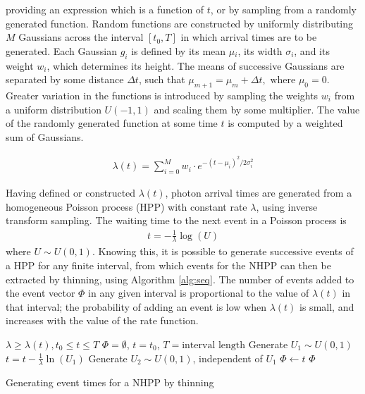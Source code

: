 \documentclass[a4paper,11pt]{article}
\begin{document}
  providing an expression which is a function of $t$, or by sampling from a
  randomly generated function. Random functions are constructed by uniformly
  distributing $M$ Gaussians across the interval $\left[t_0,T\right]$ in which
  arrival times are to be generated. Each Gaussian $g_i$ is defined by its mean
  $\mu$$_i$, its width $\sigma$$_i$, and its weight $w_i$, which determines its
  height. The means of successive Gaussians are separated by some distance
  $\Delta t$, such that $\mu_{m+1}=\mu_m + \Delta t,\text{ where }
  \mu_0=0$. Greater variation in the functions is introduced by sampling the
  weights $w_i$ from a uniform distribution $U(-1,1)$ and scaling them by some
  multiplier. The value of the randomly generated function at some time $t$ is
  computed by a weighted sum of Gaussians.

  \begin{align}
  \lambda(t) = \sum_{i=0}^M w_i\cdot e^{-(t-\mu_i)^2/2\sigma_i^2}
  \end{align}

  Having defined or constructed $\lambda(t)$, photon arrival times are generated
  from a homogeneous Poisson process (HPP) with constant rate $\lambda$, using
  inverse transform sampling. The waiting time to the next event in a Poisson
  process is \cite{1998art}
  \begin{align}\label{eq:homlambda}
  t=-\frac{1}{\lambda}\log(U)
  \end{align} where $U\sim U(0,1)$. Knowing this, it is possible to generate
  successive events of a HPP for any finite interval, from which events for the
  NHPP can then be extracted by thinning, using Algorithm \ref{alg:seq}. The
  number of events added to the event vector $\Phi$ in any given interval is
  proportional to the value of $\lambda(t)$ in that interval; the probability of
  adding an event is low when $\lambda(t)$ is small, and increases with the
  value of the rate function.

  \begin{algorithm}[H]
  \begin{algorithmic}[1]
  \REQUIRE $\lambda\geq \lambda(t), t_0 \leq t \leq T$
  \STATE $\Phi=\emptyset$, $t=t_0$, $T=\text{interval length}$
  \STATE Generate $U_1\sim U(0,1)$
  \STATE $t=t-\frac{1}{\lambda}\ln(U_1)$
  \STATE Generate $U_2\sim U(0,1)$, independent of $U_1$
  \STATE $\Phi \leftarrow t$
  \ENDIF
  \ENDWHILE
  \RETURN $\Phi$
  \end{algorithmic}
  \caption{Generating event times for a NHPP by thinning}
  \label{alg:seq}
  \end{algorithm}
\end{document}
